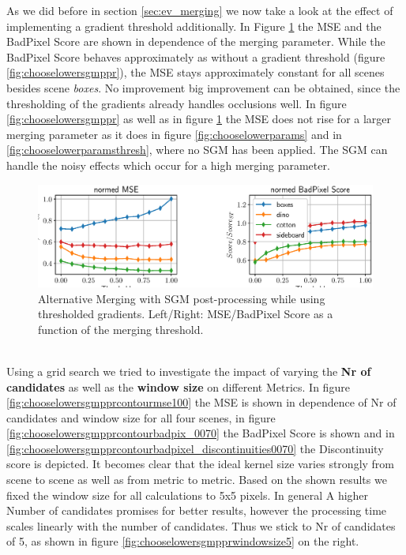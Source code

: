 \documentclass  [
  paper    = a4,
  BCOR     = 10mm,
  twoside,
  fontsize = 12pt,
  fleqn,
  toc      = bibnumbered,
  toc      = listofnumbered,
  numbers  = noendperiod,
  headings = normal,
  listof   = leveldown,
  version  = 3.03
]                                       {scrreprt}
\begin{document}
As we did before in section \ref{sec:ev_merging} we now take a look at the effect of implementing a gradient threshold additionally. In Figure \ref{fig:chooselowersgmpprthresh} the MSE and the BadPixel Score are shown in dependence of the merging parameter. While the BadPixel Score behaves approximately as without a gradient threshold (figure \ref{fig:chooselowersgmppr}), the MSE stays approximately constant for all scenes besides scene \textit{boxes}. No improvement big improvement can be obtained, since the thresholding of the gradients already handles occlusions well. 
In figure \ref{fig:chooselowersgmppr} as well as in figure \ref{fig:chooselowersgmpprthresh} the MSE does not rise for a larger merging parameter as it does in figure \ref{fig:chooselowerparams} and in \ref{fig:chooselowerparamsthresh}, where no SGM has been applied. The SGM can handle the noisy effects which occur for a high merging parameter.
\begin{figure}
	\centering
	\includegraphics[width=1\linewidth]{images/choose_lower_sgm_ppr_thresh}
	\caption[Alternative Merging with SGM post-processing with thresholded gradients]{Alternative Merging with SGM post-processing while using thresholded gradients. Left/Right: MSE/BadPixel Score as a function of the merging threshold.}
	\label{fig:chooselowersgmpprthresh}
\end{figure}
\ \\
Using a grid search we tried to investigate the impact of varying the \textbf{Nr of candidates} as well as the \textbf{window size} on different Metrics. In figure \ref{fig:chooselowersgmpprcontourmse100} the MSE is shown in dependence of Nr of candidates and window size for all four scenes, in figure \ref{fig:chooselowersgmpprcontourbadpix_0070} the BadPixel Score is shown and in \ref{fig:chooselowersgmpprcontourbadpixel_discontinuities0070} the Discontinuity score is depicted. It becomes clear that the ideal kernel size varies strongly from scene to scene as well as from metric to metric. Based on the shown results we fixed the window size for all calculations to 5x5 pixels. In general A higher Number of candidates promises for better results, however the processing time scales linearly with the number of candidates. Thus we stick to Nr of candidates of 5, as shown in figure \ref{fig:chooselowersgmpprwindowsize5} on the right.
\end{document}
